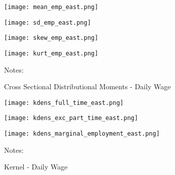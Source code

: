 \documentclass[12pt, a4paper]{article}
\begin{document}
\begin{figure}[!h]
\captionsetup{font=large}
\caption{Cross Sectional Distributional Moments - Daily Wage}
	\begin{minipage}[b]{0.48\textwidth} 
		\centering
		\texttt{[image: mean\_emp\_east.png]}
		\label{fig:mean_emp_east}
	\end{minipage}
	\begin{minipage}[b]{0.48\textwidth}
		\centering
		\texttt{[image: sd\_emp\_east.png]}
		\label{fig:var_emp_east}
	\end{minipage}
	\begin{minipage}[b]{0.48\textwidth} 
		\centering
		\texttt{[image: skew\_emp\_east.png]}
		\label{fig:skew_emp_east}
	\end{minipage}
	\begin{minipage}[b]{0.48\textwidth}
		\centering
		\texttt{[image: kurt\_emp\_east.png]}
		\label{fig:kurt_emp_east}
	\end{minipage}
\footnotesize{
\justifying Notes: \par} 
\end{figure}

\begin{figure}[!h]
\captionsetup{font=large}
\caption{Kernel - Daily Wage}
	\begin{minipage}[b]{0.32\textwidth} 
		\centering
		\texttt{[image: kdens\_full\_time\_east.png]}
		\label{fig:kdens_full_time_east}
	\end{minipage}
	\begin{minipage}[b]{0.32\textwidth}
		\centering
		\texttt{[image: kdens\_exc\_part\_time\_east.png]}
		\label{fig:kdens_exc_part_time_east}
	\end{minipage}
	\begin{minipage}[b]{0.32\textwidth} 
		\centering
		\texttt{[image: kdens\_marginal\_employment\_east.png]}
		\label{fig:kdens_marginal_employment_east}
	\end{minipage}
\footnotesize{
\justifying Notes: \par} 
\end{figure}
\end{document}

